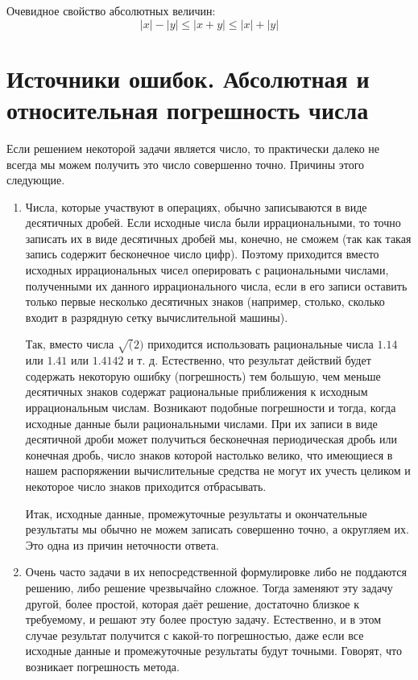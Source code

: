 Очевидное свойство абсолютных величин:
$$|x| - |y| \leq |x + y| \leq |x| + |y|$$

\section[Погрешности числа]{Источники ошибок. Абсолютная и \linebreak относительная погрешность
числа}
Если решением некоторой задачи является число, то практически далеко не всегда
мы можем получить это число совершенно точно. Причины этого следующие.

\begin{enumerate}
	\item Числа, которые участвуют в операциях, обычно записываются в виде
		десятичных дробей. Если исходные числа были иррациональными, то
		точно записать их в виде десятичных дробей мы, конечно, не
		сможем (так как такая запись содержит бесконечное число цифр).
		Поэтому приходится вместо исходных иррациональных чисел
		оперировать с рациональными числами, полученными их данного
		иррационального числа, если в его записи оставить только первые
		несколько десятичных знаков (например, столько, сколько входит
		в разрядную сетку вычислительной машины).

		Так, вместо числа $\sqrt(2)$ приходится использовать
		рациональные числа $1.14$ или $1.41$ или $1.4142$ и т. д.
		Естественно, что результат действий будет содержать некоторую
		ошибку (погрешность) тем большую, чем меньше десятичных знаков
		содержат рациональные приближения к исходным иррациональным
		числам. Возникают подобные погрешности и тогда, когда исходные
		данные были рациональными числами. При их записи в виде
		десятичной дроби может получиться бесконечная периодическая
		дробь или конечная дробь, число знаков которой настолько
		велико, что имеющиеся в нашем распоряжении вычислительные
		средства не могут их учесть целиком и некоторое число знаков
		приходится отбрасывать.

		Итак, исходные данные, промежуточные результаты и окончательные
		результаты мы обычно не можем записать совершенно точно, а
		округляем их. Это одна из причин неточности ответа.

	\item Очень часто задачи в их непосредственной формулировке либо не
		поддаются решению, либо решение чрезвычайно сложное. Тогда
		заменяют эту задачу другой, более простой, которая даёт
		решение, достаточно близкое к требуемому, и решают эту более
		простую задачу. Естественно, и в этом случае результат
		получится с какой-то погрешностью, даже если все исходные
		данные и промежуточные результаты будут точными. Говорят, что
		возникает погрешность метода.


\end{enumerate}
